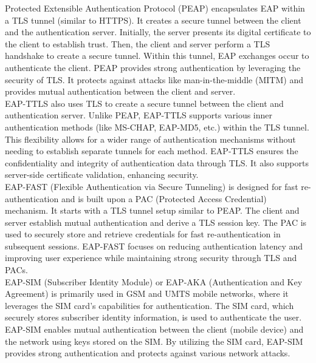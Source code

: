 \documentclass{article}
\begin{document}
	Protected Extensible Authentication Protocol (PEAP) encapsulates EAP within a TLS tunnel (similar to HTTPS). It creates a secure tunnel between the client and the authentication server. Initially, the server presents its digital certificate to the client to establish trust. Then, the client and server perform a TLS handshake to create a secure tunnel. Within this tunnel, EAP exchanges occur to authenticate the client. PEAP provides strong authentication by leveraging the security of TLS. It protects against attacks like man-in-the-middle (MITM) and provides mutual authentication between the client and server.\\

	EAP-TTLS also uses TLS to create a secure tunnel between the client and authentication server. Unlike PEAP, EAP-TTLS supports various inner authentication methods (like MS-CHAP, EAP-MD5, etc.) within the TLS tunnel. This flexibility allows for a wider range of authentication mechanisms without needing to establish separate tunnels for each method. EAP-TTLS ensures the confidentiality and integrity of authentication data through TLS. It also supports server-side certificate validation, enhancing security.\\

	EAP-FAST (Flexible Authentication via Secure Tunneling) is designed for fast re-authentication and is built upon a PAC (Protected Access Credential) mechanism. It starts with a TLS tunnel setup similar to PEAP. The client and server establish mutual authentication and derive a TLS session key. The PAC is used to securely store and retrieve credentials for fast re-authentication in subsequent sessions.  EAP-FAST focuses on reducing authentication latency and improving user experience while maintaining strong security through TLS and PACs.\\

	EAP-SIM (Subscriber Identity Module) or EAP-AKA (Authentication and Key Agreement) is primarily used in GSM and UMTS mobile networks, where it leverages the SIM card’s capabilities for authentication. The SIM card, which securely stores subscriber identity information, is used to authenticate the user. EAP-SIM enables mutual authentication between the client (mobile device) and the network using keys stored on the SIM. By utilizing the SIM card, EAP-SIM provides strong authentication and protects against various network attacks.\\
  
\end{document}
